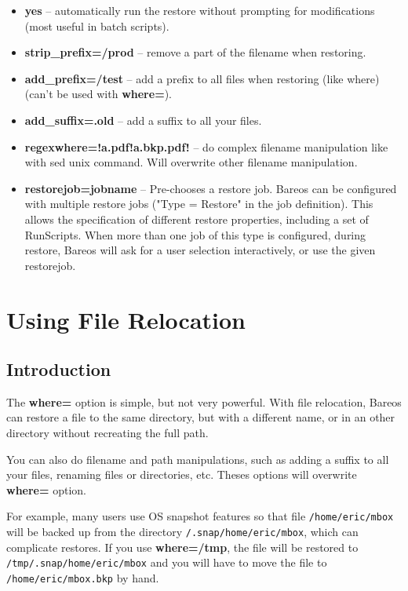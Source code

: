 \begin{itemize}
\item {\bf yes} -- automatically run the restore without prompting  for
   modifications (most useful in batch scripts).
\item {\bf strip\_prefix=/prod} -- remove a part of the filename when restoring.
\item {\bf add\_prefix=/test} -- add a prefix to all files when restoring (like
  where) (can't be used with {\bf where=}).
\item {\bf add\_suffix=.old} -- add a suffix to all your files.
\item {\bf regexwhere=!a.pdf!a.bkp.pdf!} -- do complex filename manipulation
  like with sed unix command. Will overwrite other filename manipulation.
\item {\bf restorejob=jobname} -- Pre-chooses a restore job. Bareos can be
  configured with multiple restore jobs ("Type = Restore" in the job
  definition). This allows the specification of different restore properties,
  including a set of RunScripts. When more than one job of this type is
  configured, during restore, Bareos will ask for a user selection
  interactively, or use the given restorejob.
\end{itemize}

\label{restorefilerelocation}
\section{Using File Relocation}
\label{filerelocation}

\subsection{Introduction}

The \textbf{where=} option is simple, but not very powerful. With file
relocation, Bareos can restore a file to the same directory, but with a
different name, or in an other directory without recreating the full path.

You can also do filename and path manipulations,
such as adding a suffix to all your files, renaming files
or directories, etc.  Theses options will overwrite {\bf where=} option.


For example, many users use OS snapshot features so that file
\texttt{/home/eric/mbox} will be backed up from the directory
\texttt{/.snap/home/eric/mbox}, which can complicate restores.  If you use
\textbf{where=/tmp}, the file will be restored to
\texttt{/tmp/.snap/home/eric/mbox} and you will have to move the file to
\texttt{/home/eric/mbox.bkp} by hand.

